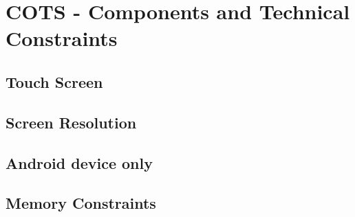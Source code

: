 \section{COTS - Components and Technical Constraints}

\subsection{Touch Screen}


\subsection{Screen Resolution}


\subsection{Android device only}


\subsection{Memory Constraints}


